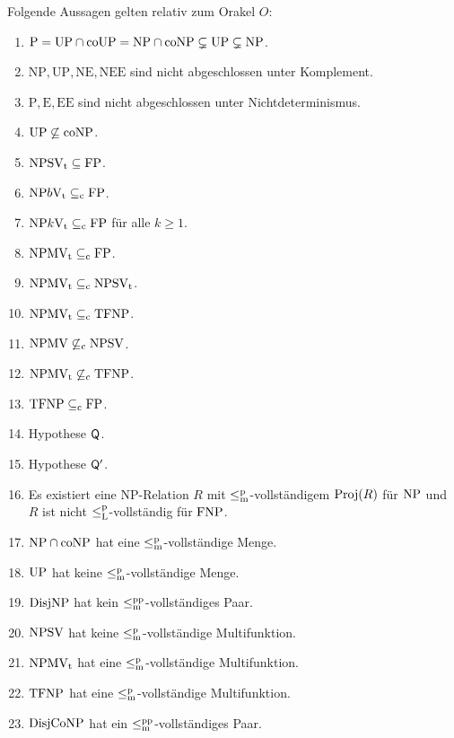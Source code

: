 \begin{corollary}
    Folgende Aussagen gelten relativ zum Orakel $O$:
    \begin{enumerate}[noitemsep,midpenalty=0]\raggedright
        \item $\mathrm{P}=\mathrm{UP}\cap\mathrm{coUP}=\mathrm{NP}\cap\mathrm{coNP}\subsetneq \mathrm{UP} \subsetneq \mathrm{NP}$.
        \item $\mathrm{NP, UP, NE, NEE}$ sind nicht abgeschlossen unter Komplement. 
        \item $\mathrm{P, E, EE}$ sind nicht abgeschlossen unter Nichtdeterminismus.
        \item $\mathrm{UP}\not\subseteq \mathrm{coNP}$.
        \item $\mathrm{NPSV_t}\subseteq\mathrm{FP}$.
        \item $\mathrm{NP}b\mathrm{V_t} \subseteq_{\mathrm{c}}\mathrm{FP}$.
        \item $\mathrm{NP}k\mathrm{V_t} \subseteq_{\mathrm{c}}\mathrm{FP}$ für alle $k\geq 1$.
        \item $\mathrm{NPMV_t} \subseteq_{\mathrm{c}} \mathrm{FP}$.
        \item $\mathrm{NPMV_t} \subseteq_{\mathrm{c}} \mathrm{NPSV_t}$.
        \item $\mathrm{NPMV_t} \subseteq_{\mathrm{c}} \mathrm{TFNP}$.
        \item $\mathrm{NPMV} \not\subseteq_{\mathrm{c}} \mathrm{NPSV}$.
        \item $\mathrm{NPMV_t} \not\subseteq_{\mathrm{c}} \mathrm{TFNP}$.
        \item $\mathrm{TFNP}\subseteq_{\mathrm{c}} \mathrm{FP}$.
        \item Hypothese $\mathsf{Q}$.
        \item Hypothese $\mathsf{Q}'$.
        \item Es existiert eine NP-Relation $R$ mit $\leq_\mathrm{m}^\mathrm{p}$-vollständigem $\operatorname{Proj}(R)$ für $\mathrm{NP}$ und $R$ ist nicht $\leq_\mathrm{L}^\mathrm{p}$-vollständig für $\mathrm{FNP}$.
        \item $\mathrm{NP}\cap\mathrm{coNP}$ hat eine $\leq_\mathrm{m}^\mathrm{p}$-vollständige Menge.
        \item $\mathrm{UP}$ hat keine $\leq_\mathrm{m}^\mathrm{p}$-vollständige Menge.
        \item $\mathrm{DisjNP}$ hat kein $\leq_\mathrm{m}^\mathrm{pp}$-vollständiges Paar.
        \item $\mathrm{NPSV}$ hat keine $\leq_\mathrm{m}^\mathrm{p}$-vollständige Multifunktion.
        \item $\mathrm{NPMV_t}$ hat eine $\leq_\mathrm{m}^\mathrm{p}$-vollständige Multifunktion.
        \item $\mathrm{TFNP}$ hat eine $\leq_\mathrm{m}^\mathrm{p}$-vollständige Multifunktion.
        \item $\mathrm{DisjCoNP}$ hat ein $\leq_\mathrm{m}^\mathrm{pp}$-vollständiges Paar.

\end{enumerate}
\end{corollary}
